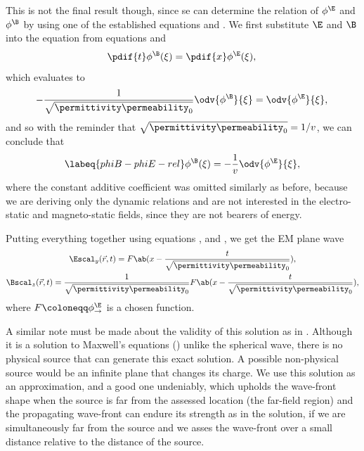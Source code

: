 This is not the final result though, since se can determine the relation of \(\phi^{\E}\) and \(\phi^{\B}\) by using one
    of the established equations  and .
We first substitute \(\E\) and \(\B\) into the equation  from equations  and
    \begin{equation*}
        \pdif{t}\phi^{\B}(\xi) = \pdif{x}\phi^{\E}(\xi), \\
    \end{equation*}
    which evaluates to
    \begin{equation*}
        - \frac{1}{\sqrt{\permittivity\permeability_0}}\odv{\phi^{\B}}{\xi} = \odv{\phi^{\E}}{\xi}, \\
    \end{equation*}
    and so with the reminder that \(\sqrt{\permittivity\permeability_0} = 1/v\), we can conclude that
    \begin{equation}
        \labeq{phiB-phiE-rel}
        \phi^{\B}(\xi) = -\frac{1}{v}\odv{\phi^{\E}}{\xi},
    \end{equation}
    where the constant additive coefficient was omitted similarly as before, because we are deriving only the dynamic
    relations and are not interested in the electro-static and magneto-static fields, since they are not bearers of
    energy.

Putting everything together using equations ,  and 
    , we get the \ac{EM} plane wave 
    \begin{gather}
        \Escal_y(\vec{r}, t) = F\ab(x - \frac{t}{\sqrt{\permittivity\permeability_0}}), \\
        \Bscal_z(\vec{r}, t) = \frac{1}{\sqrt{\permittivity\permeability_0}}F\ab(x - \frac{t}{\sqrt{\permittivity\permeability_0}}),
    \end{gather}
    where \(F \coloneqq \phi^{\E}_{\rightarrow}\) is a chosen function.

A similar note must be made about the validity of this solution as in .
Although it is a solution to Maxwell's equations () unlike the spherical wave, there is 
    no physical source that can generate this exact solution.
A possible non-physical source would be an infinite plane that changes its charge.
We use this solution as an approximation, and a good one undeniably, which upholds the wave-front shape when the 
    source is far from the assessed location (the far-field region) and the propagating wave-front can endure its
    strength as in the solution, if we are simultaneously far from the source and we asses the wave-front over a small
    distance relative to the distance of the source.

